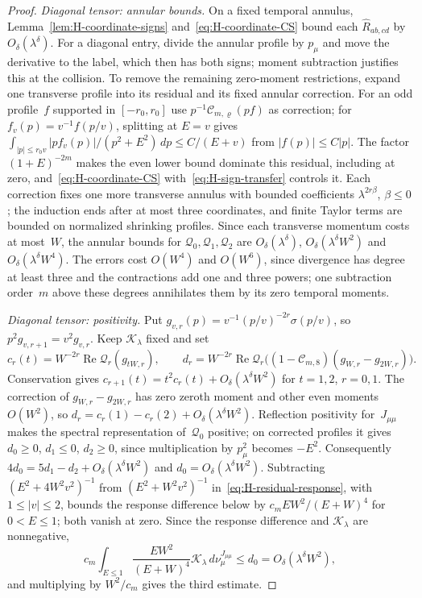 \begin{proof}
\emph{Diagonal tensor: annular bounds.} On a fixed temporal annulus, Lemma~\ref{lem:H-coordinate-signs} and~\eqref{eq:H-coordinate-CS} bound each $\widehat R_{ab,cd}$ by $O_\delta(\lambda^\delta)$. For a diagonal entry, divide the annular profile by $p_\mu$ and move the derivative to the label, which then has both signs; moment subtraction justifies this at the collision. To remove the remaining zero-moment restrictions, expand one transverse profile into its residual and its fixed annular correction. For an odd profile~$f$ supported in $[-r_0,r_0]$ use $p^{-1}\mathcal C_{m,\varrho}(pf)$ as correction; for $f_v(p)=v^{-1}f(p/v)$, splitting at $E=v$ gives $\int_{|p|\le r_0v}|pf_v(p)|/(p^2+E^2)\,dp\le C/(E+v)$ from $|f(p)|\le C|p|$. The factor $(1+E)^{-2m}$ makes the even lower bound dominate this residual, including at zero, and~\eqref{eq:H-coordinate-CS} with~\eqref{eq:H-sign-transfer} controls it. Each correction fixes one more transverse annulus with bounded coefficients $\lambda^{2r\beta}$, $\beta\le0$; the induction ends after at most three coordinates, and finite Taylor terms are bounded on normalized shrinking profiles. Since each transverse momentum costs at most~$W$, the annular bounds for $\mathcal Q_0,\mathcal Q_1,\mathcal Q_2$ are $O_\delta(\lambda^\delta)$, $O_\delta(\lambda^\delta W^2)$ and $O_\delta(\lambda^\delta W^4)$. The errors cost $O(W^4)$ and $O(W^6)$, since divergence has degree at least three and the contractions add one and three powers; one subtraction order~$m$ above these degrees annihilates them by its zero temporal moments.

\emph{Diagonal tensor: positivity.} Put $g_{v,r}(p)=v^{-1}(p/v)^{-2r}\sigma(p/v)$, so $p^2g_{v,r+1}=v^2g_{v,r}$. Keep $\mathcal K_\lambda$ fixed and set
\begin{equation*}
c_r(t)=W^{-2r}\operatorname{Re}\mathcal Q_r(g_{tW,r}),\qquad
d_r=W^{-2r}\operatorname{Re}\mathcal Q_r\bigl((1-\mathcal C_{m,8})(g_{W,r}-g_{2W,r})\bigr).
\end{equation*}
Conservation gives $c_{r+1}(t)=t^2c_r(t)+O_\delta(\lambda^\delta W^2)$ for $t=1,2$, $r=0,1$. The correction of $g_{W,r}-g_{2W,r}$ has zero zeroth moment and other even moments $O(W^2)$, so $d_r=c_r(1)-c_r(2)+O_\delta(\lambda^\delta W^2)$. Reflection positivity for~$J_{\mu\mu}$ makes the spectral representation of~$\mathcal Q_0$ positive; on corrected profiles it gives $d_0\ge0$, $d_1\le0$, $d_2\ge0$, since multiplication by $p_\mu^2$ becomes $-E^2$. Consequently $4d_0=5d_1-d_2+O_\delta(\lambda^\delta W^2)$ and $d_0=O_\delta(\lambda^\delta W^2)$. Subtracting $(E^2+4W^2v^2)^{-1}$ from $(E^2+W^2v^2)^{-1}$ in~\eqref{eq:H-residual-response}, with $1\le|v|\le2$, bounds the response difference below by $c_mEW^2/(E+W)^4$ for $0<E\le1$; both vanish at zero. Since the response difference and $\mathcal K_\lambda$ are nonnegative,
\begin{equation*}
c_m\int_{E\le1}\frac{EW^2}{(E+W)^4}\mathcal K_\lambda\,d\nu_\mu^{J_{\mu\mu}}
\le d_0=O_\delta(\lambda^\delta W^2),
\end{equation*}
and multiplying by $W^2/c_m$ gives the third estimate.


\end{proof}
